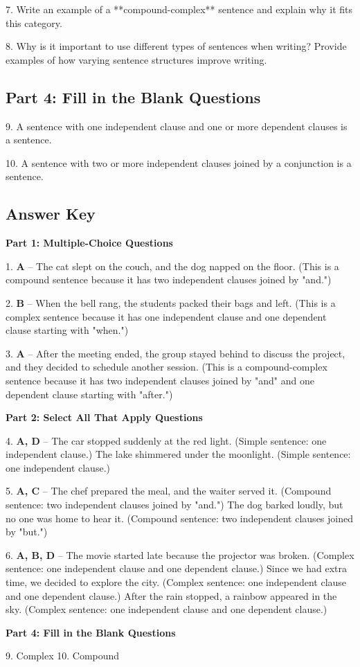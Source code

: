 \documentclass[12pt]{article}
\begin{document}
7. Write an example of a **compound-complex** sentence and explain why it fits this category.  
\vspace{4cm}

8. Why is it important to use different types of sentences when writing? Provide examples of how varying sentence structures improve writing.  
\vspace{4cm}

\subsection*{Part 4: Fill in the Blank Questions}
\vspace{1cm}
9. A sentence with one independent clause and one or more dependent clauses is a \underline{\hspace{4cm}} sentence.  
\vspace{2cm}

10. A sentence with two or more independent clauses joined by a conjunction is a \underline{\hspace{4cm}} sentence.  
\vspace{2cm}
\newpage
\subsection*{Answer Key}

\textbf{Part 1: Multiple-Choice Questions}

1. \textbf{A} – The cat slept on the couch, and the dog napped on the floor. (This is a compound sentence because it has two independent clauses joined by "and.")

2. \textbf{B} – When the bell rang, the students packed their bags and left. (This is a complex sentence because it has one independent clause and one dependent clause starting with "when.")

3. \textbf{A} – After the meeting ended, the group stayed behind to discuss the project, and they decided to schedule another session. (This is a compound-complex sentence because it has two independent clauses joined by "and" and one dependent clause starting with "after.")

\textbf{Part 2: Select All That Apply Questions}

4. \textbf{A, D} – The car stopped suddenly at the red light. (Simple sentence: one independent clause.)  
The lake shimmered under the moonlight. (Simple sentence: one independent clause.)

5. \textbf{A, C} – The chef prepared the meal, and the waiter served it. (Compound sentence: two independent clauses joined by "and.")  
The dog barked loudly, but no one was home to hear it. (Compound sentence: two independent clauses joined by "but.")

6. \textbf{A, B, D} – The movie started late because the projector was broken. (Complex sentence: one independent clause and one dependent clause.)  
Since we had extra time, we decided to explore the city. (Complex sentence: one independent clause and one dependent clause.)  
After the rain stopped, a rainbow appeared in the sky. (Complex sentence: one independent clause and one dependent clause.)

\textbf{Part 4: Fill in the Blank Questions}

9. Complex  
10. Compound
\end{document}
